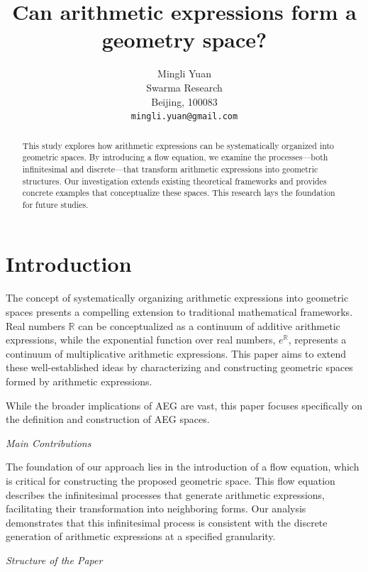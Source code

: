 \documentclass{article}
\title{Can arithmetic expressions form a geometry space?}
\date{}
\author{
Mingli Yuan \\
Swarma Research\\
Beijing, 100083 \\
\texttt{mingli.yuan@gmail.com}
}
\numberwithin{definition}{section}
\numberwithin{lemma}{section}
\numberwithin{proposition}{section}
\numberwithin{corollary}{section}
\numberwithin{theorem}{section}
\begin{document}
\maketitle

\begin{abstract}
This study explores how arithmetic expressions can be systematically organized into geometric spaces.
By introducing a flow equation, we examine the processes—both infinitesimal and discrete—that transform arithmetic expressions into geometric structures.
Our investigation extends existing theoretical frameworks and provides concrete examples that conceptualize these spaces.
This research lays the foundation for future studies.
\end{abstract}


\setcounter{tocdepth}{1}
\tableofcontents
\newpage

\section{Introduction}\label{sec:introduction}

The concept of systematically organizing arithmetic expressions into geometric spaces presents a compelling extension to traditional mathematical frameworks.
Real numbers $\mathbb{R}$ can be conceptualized as a continuum of additive arithmetic expressions, while the exponential function over real numbers,
$e^\mathbb{R}$, represents a continuum of multiplicative arithmetic expressions.
This paper aims to extend these well-established ideas by characterizing and constructing geometric spaces formed by arithmetic expressions.

While the broader implications of AEG are vast, this paper focuses specifically on the definition and construction of AEG spaces.

\emph{Main Contributions}

The foundation of our approach lies in the introduction of a flow equation, which is critical for constructing the proposed geometric space.
This flow equation describes the infinitesimal processes that generate arithmetic expressions, facilitating their transformation into neighboring forms.
Our analysis demonstrates that this infinitesimal process is consistent with the discrete generation of arithmetic expressions at a specified granularity.

\emph{Structure of the Paper}
\end{document}
